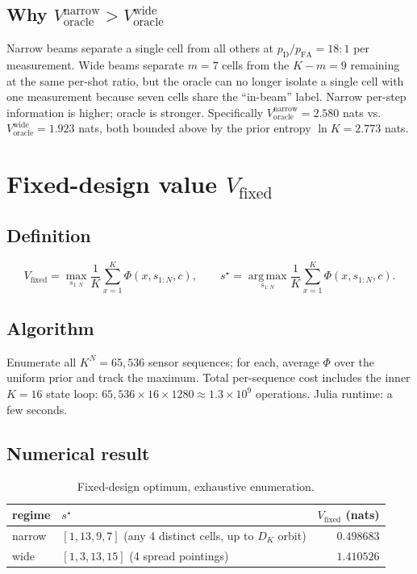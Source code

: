 \documentclass[11pt,a4paper]{article}
\newcommand{\argmax}{\operatorname*{arg\,max}}
\begin{document}
\subsection{Why $V_{\text{oracle}}^{\text{narrow}} > V_{\text{oracle}}^{\text{wide}}$}
Narrow beams separate a single cell from all others at $p_{\mathrm{D}}/p_{\mathrm{FA}} = 18{:}1$ per measurement.  Wide beams separate $m = 7$ cells from the $K - m = 9$ remaining at the same per-shot ratio, but the oracle can no longer isolate a single cell with one measurement because seven cells share the ``in-beam'' label.  Narrow per-step information is higher; oracle is stronger.  Specifically $V_{\text{oracle}}^{\text{narrow}} = 2.580$ nats vs.\ $V_{\text{oracle}}^{\text{wide}} = 1.923$ nats, both bounded above by the prior entropy $\ln K = 2.773$ nats.

\section{Fixed-design value $V_{\text{fixed}}$}

\subsection{Definition}
\[
  V_{\text{fixed}} = \max_{s_{1:N}} \frac{1}{K} \sum_{x=1}^K \Phi(x, s_{1:N}, c),
  \qquad s^\star = \argmax_{s_{1:N}} \frac{1}{K}\sum_{x=1}^K \Phi(x, s_{1:N}, c).
\]

\subsection{Algorithm}
Enumerate all $K^N = 65{,}536$ sensor sequences; for each, average $\Phi$ over the uniform prior and track the maximum.  Total per-sequence cost includes the inner $K = 16$ state loop: $65{,}536 \times 16 \times 1280 \approx 1.3 \times 10^9$ operations.  Julia runtime: a few seconds.

\subsection{Numerical result}

\begin{table}[h!]
\centering
\begin{tabular}{@{}llr@{}}
\toprule
regime & $s^\star$ & $V_{\text{fixed}}$ (nats) \\
\midrule
narrow & $[1, 13, 9, 7]$  (any 4 distinct cells, up to $D_K$ orbit) & $0.498683$ \\
wide   & $[1, 3, 13, 15]$ (4 spread pointings)                     & $1.410526$ \\
\bottomrule
\end{tabular}
\caption{Fixed-design optimum, exhaustive enumeration.}
\label{tab:Vfixed}
\end{table}
\end{document}

